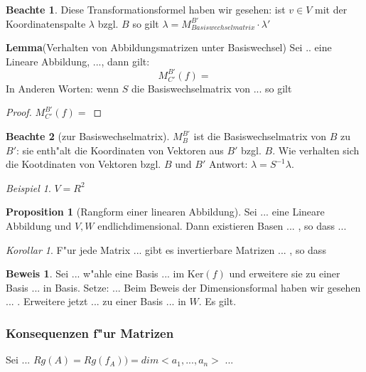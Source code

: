 \documentclass[11pt]{article}
\theoremstyle{remark}
\newtheorem{exa}{Beispiel}[section]
\theoremstyle{definition}
\newtheorem{prof}{Beweis}
\newtheorem*{notte}{Beachte}
\newtheorem*{proposition}{Proposition}
\theoremstyle{remark}
\newtheorem*{korollar}{Korollar}
\begin{document}
\begin{notte}
  Diese Transformationsformel haben wir gesehen: ist $v\in V$ mit der
  Koordinatenspalte $\lambda$ bzgl. $B$ so gilt
  $\lambda=M^{B'}_{Basiswechselmatrix}\cdot \lambda ' $
\end{notte}

\textbf{Lemma}(Verhalten von Abbildungsmatrizen unter Basiswechsel)
Sei .. eine Lineare Abbildung, ..., dann gilt:
\[
  M^{B'}_{C'}(f)=
\] In Anderen Worten: wenn $S$ die Basiswechselmatrix von ... so gilt

\begin{proof}
  $M^{B'}_{C'}(f)=$
\end{proof}

\begin{notte}[zur Basiswechselmatrix]
  $ M^{B'}_{B}$ ist die Basiswechselmatrix von $B$ zu $B'$: sie enth"alt die
  Koordinaten von Vektoren aus $B'$ bzgl. $B$. Wie verhalten sich die
  Kootdinaten von Vektoren bzgl. $B$ und $B'$ Antwort: $\lambda =
  S^{-1}\lambda$.
\end{notte}

\begin{exa}
  $V=R^{2}$
\end{exa}

\begin{proposition}[Rangform einer linearen Abbildung]
  Sei ... eine Lineare Abbildung und $V,W$ endlichdimensional. Dann existieren
  Basen ... , so dass ...
\end{proposition}

\begin{korollar}
  F"ur jede Matrix ... gibt es invertierbare Matrizen ... , so dass
\end{korollar}

\begin{prof}
  Sei ... w"ahle eine Basis ... im $\text{Ker}(f)$  und erweitere sie zu einer
  Basis ... in Basis. Setze: ... Beim Beweis der Dimensionsformal haben wir
  gesehen ... . Erweitere jetzt ... zu einer Basis ... in $W$. Es gilt. 
\end{prof}

\subsubsection{Konsequenzen f"ur Matrizen}
\label{sec:konsma}

Sei ...
$Rg(A)=Rg(f_A))=dim<a_1,...,a_n>$ ...
\end{document}
